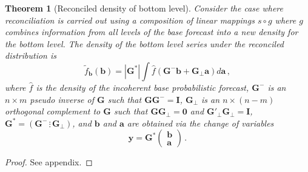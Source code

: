 \documentclass[12pt]{article}
\newtheorem{theo}{Theorem}[section]
\theoremstyle{definition}
\begin{document}
%

\begin{theo}[Reconciled density of bottom level]\label{theo:bottomdens}
	Consider the case where reconciliation is carried out using a composition of linear mappings $s\circ g$ where $g$ combines information from all levels of the base forecast into a new density for the bottom level.  The density of the bottom level series under the reconciled distribution is
	\[
	\tilde{f}_{\bm{b}}(\bm{b})=|\bm{G^*}|\int \hat{f}(\bm{G}^{-}{\bm b}+\bm{G}_\perp {\bm a})d\bm{a}\,,
	\]
	where $\hat{f}$ is the density of the incoherent base probabilistic forecast, $\bm{G^-}$ is an $n\times m$ pseudo inverse of $\bm{G}$ such that $\bm{G}\bm{G}^-=\bm{I}$, $\bm{G_\perp}$ is an $n\times (n-m)$ orthogonal complement to $\bm{G}$ such that $\bm{G}\bm{G}_\perp=\bm{0}$ and $\bm{G}'_\perp\bm{G}_\perp=\bm{I}$, $\bm{G^*}=\left(\bm{G}^-\,\vdots\,\bm{G}_\perp\right)$, and $\bm{b}$ and $\bm{a}$ are obtained via the change of variables
	\[
	\bm{y}=\bm{G^*}\begin{pmatrix}\bm{b}\\\bm{a}\end{pmatrix}\,.
	\] 
\end{theo}

\begin{proof}
	See appendix.
\end{proof}
\end{document}
